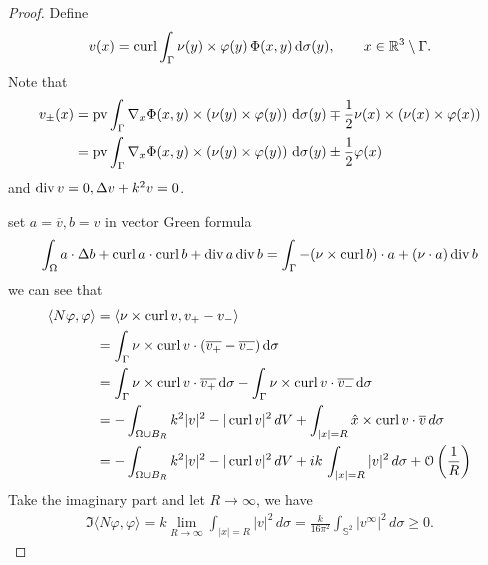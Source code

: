 \begin{proof}
Define 
\begin{align}\label{eq:v}
  v(x) = \operatorname{curl}\int_{\Gamma}\nu(y)\times\varphi(y)\,\Phi(x,y)\,\text{d}\sigma(y),\qquad x\in\mathbb{R}^3\setminus\Gamma.
\end{align}
Note that 
  \begin{align*}
  v_\pm(x) &= \operatorname{pv}\int_{\Gamma}\nabla_x\Phi(x, y)\times\left(\nu(y)\times\varphi(y)\right)\,\text{d}\sigma(y)\mp\frac{1}{2}\nu(x)\times(\nu(x)\times\varphi(x))\\ 
  &= \operatorname{pv}\int_{\Gamma}\nabla_x\Phi(x, y)\times\left(\nu(y)\times\varphi(y)\right)\,\text{d}\sigma(y)\pm\frac{1}{2}\varphi(x) 
  \end{align*}
and $\operatorname{div} v=0, \Delta v + k^2 v=0$. 

set $a=\overline{v}, b=v$ in vector Green formula
\begin{align*}
  \int_{\Omega}a\cdot\Delta b+\operatorname{curl} a\cdot\operatorname{curl} b + \operatorname{div} a\operatorname{div} b=\int_{\Gamma}-(\nu\times\operatorname{curl} b)\cdot a+(\nu\cdot a)\operatorname{div} b
\end{align*}
we can see that
  \begin{align*}
    \langle N\varphi, \varphi\rangle &=\left\langle \nu\times\operatorname{curl} v, v_+-v_-\right\rangle \\
    &=\int_{\Gamma}\nu\times\operatorname{curl} v\cdot(\overline{v_+} - \overline{v_-})\,\text{d}\sigma \\
    &=\int_{\Gamma}\nu\times\operatorname{curl} v\cdot\overline{v_+}\,\text{d}\sigma- \int_{\Gamma}\nu\times\operatorname{curl} v\cdot\overline{v_-}\,\text{d}\sigma\\
    &=-\int_{\Omega\cup B_R}k^2|v|^2 - |\operatorname{curl} v|^2\,dV + \int_{|x|=R}\hat{x}\times\operatorname{curl} v\cdot\overline{v}\,d\sigma \\
    &=-\int_{\Omega\cup B_R}k^2|v|^2 - |\operatorname{curl} v|^2\,dV + ik\,\int_{|x|=R}|v|^2\,d\sigma+\mathcal{O}\left(\frac{1}{R}\right)
  \end{align*}
Take the imaginary part and let $R\to\infty$, we have
  \begin{align*}
    \Im\langle N\varphi,\varphi\rangle = k\lim_{R\to\infty}\int_{|x|=R}|v|^2\,d\sigma = \frac{k}{16\pi^2}\int_{\mathbb{S}^2}|v^\infty|^2\,d\sigma\geqslant 0.
  \end{align*}
\end{proof}

